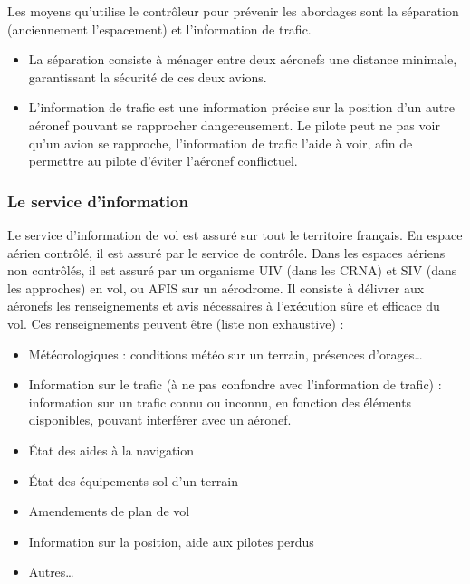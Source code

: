Les moyens qu'utilise le contrôleur pour prévenir les abordages sont la séparation (anciennement l'espacement) et l'information de trafic.
\begin{itemize}
    \item La séparation consiste à ménager entre deux aéronefs une distance minimale, garantissant la sécurité de ces deux avions.
    \item L'information de trafic est une information précise sur la position d'un autre aéronef pouvant se rapprocher dangereusement. Le pilote peut ne pas voir qu'un avion se rapproche, l'information de trafic l'aide à voir, afin de permettre au pilote d'éviter l'aéronef conflictuel.
\end{itemize}\medskip

        \subsubsection{Le service d'information}
Le service d'information de vol est assuré sur tout le territoire français. En espace aérien contrôlé, il est assuré par le service de contrôle. Dans les espaces aériens non contrôlés, il est assuré par un organisme UIV (dans les CRNA) et SIV (dans les approches) en vol, ou AFIS sur un aérodrome.
Il consiste à délivrer aux aéronefs les renseignements et avis nécessaires à l'exécution sûre et efficace du vol. Ces renseignements peuvent être (liste non exhaustive) :
\begin{itemize}
\item Météorologiques : conditions météo sur un terrain, présences d'orages…
\item Information sur le trafic (à ne pas confondre avec l'information de trafic) : information sur un trafic connu ou inconnu, en fonction des éléments disponibles, pouvant interférer avec un aéronef.
\item État des aides à la navigation
\item État des équipements sol d'un terrain
\item Amendements de plan de vol
\item Information sur la position, aide aux pilotes perdus
\item Autres…
\end{itemize}\medskip


